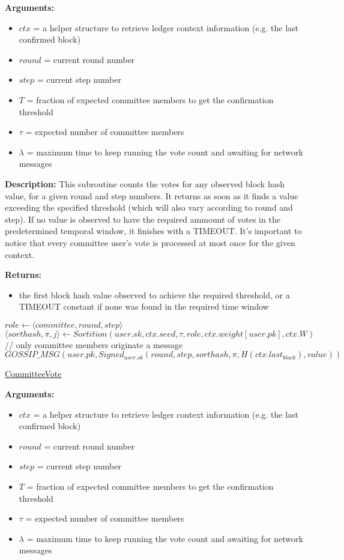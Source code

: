 \documentclass[10pt,a4paper]{article}
\begin{document}
\textbf{Arguments:}
\begin{itemize}
    \item $ctx$ = a helper structure to retrieve ledger context information (e.g. the last confirmed block)
    \item $round$ = current round number
    \item $step$ = current step number
    \item $T$ = fraction of expected committee members to get the confirmation threshold
    \item $\tau$ = expected number of committee members
    \item $\lambda$ = maximum time to keep running the vote count and awaiting for network messages
  \end{itemize}

\textbf{Description:}
This subroutine counts the votes for any observed block hash value, for a given round and step numbers.
It returns as soon as it finds a value exceeding the specified threshold (which will also vary according to round and step).
If no value is observed to have the required ammount of votes in the predetermined temporal window, it finishes with a TIMEOUT.
It's important to notice that every committee user's vote is processed at most once for the given context.

\textbf{Returns:}
\begin{itemize}
    \item the first block hash value observed to achieve the required threshold, or a TIMEOUT constant if none was found in the
    required time window
  \end{itemize}

\begin{algorithm}
    \begin{algorithmic}[H]
    \State $role \gets \langle {committee},round,step\rangle$
    \State $\langle sorthash,\pi,j\rangle \gets Sortition(user.sk,ctx.seed,\tau ,role,ctx.weight[user.pk],ctx.W)$
    // only committee members originate a message
        \State $GOSSIP\_MSG(user.pk, Signed_{user.sk} (round,step,sorthash,\pi,H(ctx.last_{block}),value))$
    \EndIf
    \EndFunction
    \end{algorithmic}
    \caption{\underline{CommitteeVote}}
\end{algorithm}

\textbf{Arguments:}
\begin{itemize}
    \item $ctx$ = a helper structure to retrieve ledger context information (e.g. the last confirmed block)
    \item $round$ = current round number
    \item $step$ = current step number
    \item $T$ = fraction of expected committee members to get the confirmation threshold
    \item $\tau$ = expected number of committee members
    \item $\lambda$ = maximum time to keep running the vote count and awaiting for network messages
  \end{itemize}
\end{document}
